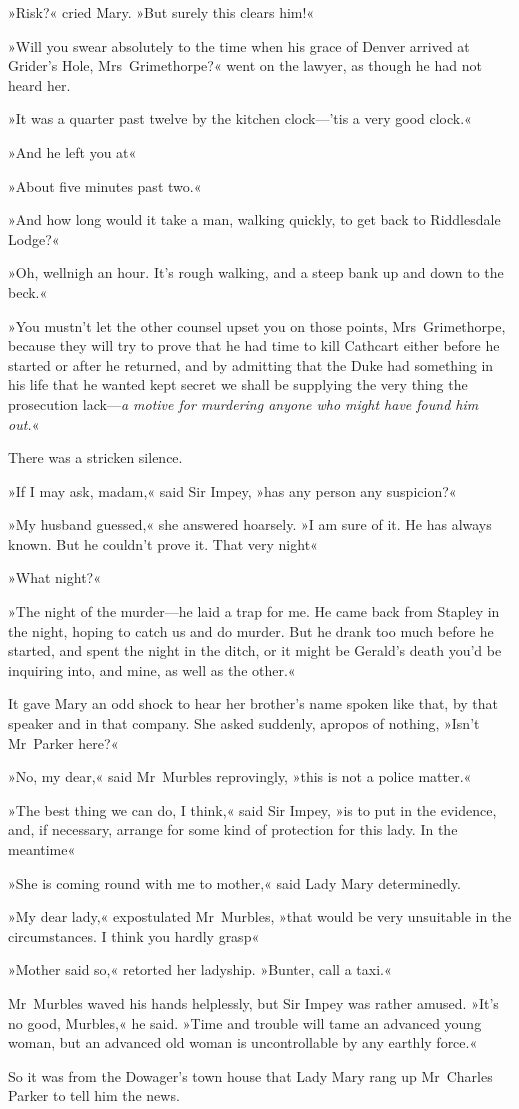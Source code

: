 »Risk?« cried Mary. »But surely this clears him!«

»Will you swear absolutely to the time when his grace of Denver arrived at Grider's Hole, Mrs~Grimethorpe?« went on the lawyer, as though he had not heard her.

»It was a quarter past twelve by the kitchen clock—'tis a very good clock.«

»And he left you at\longdash«

»About five minutes past two.«

»And how long would it take a man, walking quickly, to get back to Riddlesdale Lodge?«

»Oh, wellnigh an hour. It's rough walking, and a steep bank up and down to the beck.«

»You mustn't let the other counsel upset you on those points, Mrs~Grimethorpe, because they will try to prove that he had time to kill Cathcart either before he started or after he returned, and by admitting that the Duke had something in his life that he wanted kept secret we shall be supplying the very thing the prosecution lack—\textit{a motive for murdering anyone who might have found him out.}«

There was a stricken silence.

»If I may ask, madam,« said Sir Impey, »has any person any suspicion?«

»My husband guessed,« she answered hoarsely. »I am sure of it. He has always known. But he couldn't prove it. That very night\longdash«

»What night?«

»The night of the murder—he laid a trap for me. He came back from Stapley in the night, hoping to catch us and do murder. But he drank too much before he started, and spent the night in the ditch, or it might be Gerald's death you'd be inquiring into, and mine, as well as the other.«

It gave Mary an odd shock to hear her brother's name spoken like that, by that speaker and in that company. She asked suddenly, apropos of nothing, »Isn't Mr~Parker here?«

»No, my dear,« said Mr~Murbles reprovingly, »this is not a police matter.«

»The best thing we can do, I think,« said Sir Impey, »is to put in the evidence, and, if necessary, arrange for some kind of protection for this lady. In the meantime\longdash«

»She is coming round with me to mother,« said Lady Mary determinedly.

»My dear lady,« expostulated Mr~Murbles, »that would be very unsuitable in the circumstances. I think you hardly grasp\longdash«

»Mother said so,« retorted her ladyship. »Bunter, call a taxi.«

Mr~Murbles waved his hands helplessly, but Sir Impey was rather amused. »It's no good, Murbles,« he said. »Time and trouble will tame an advanced young woman, but an advanced old woman is uncontrollable by any earthly force.«

So it was from the Dowager's town house that Lady Mary rang up Mr~Charles Parker to tell him the news.